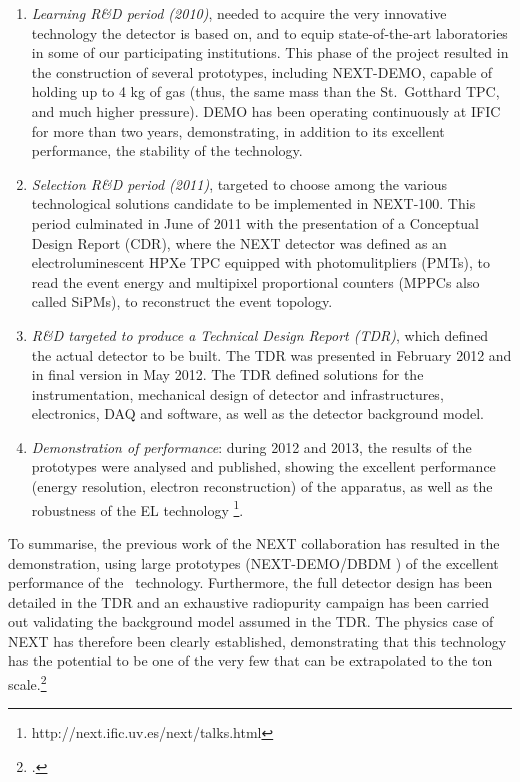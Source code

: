 \begin{enumerate}
\item {\em Learning R\&D period (2010)}, needed to acquire the very innovative technology the detector is based on, and to equip state-of-the-art laboratories in some of our participating institutions. This phase of the project resulted in the construction of several prototypes, including NEXT-DEMO, capable of holding up to 4 kg of gas (thus, the same mass than  the St.~Gotthard TPC, and much higher pressure). DEMO has been operating continuously at IFIC for more than two years, demonstrating, in addition to its excellent performance, the stability of the technology.  

\item {\em Selection R\&D period (2011)}, targeted to choose among the various technological solutions candidate to be implemented in NEXT-100. This period culminated in June of 2011 with the presentation of a Conceptual Design Report (CDR), where the NEXT detector was defined as an electroluminescent HPXe TPC equipped with photomulitpliers (PMTs),  to read the event energy and multipixel proportional counters (MPPCs also called SiPMs), to reconstruct the event topology. 

\item {\em R\&D targeted to produce a Technical Design Report (TDR)}, which defined the actual detector to be built. The TDR was presented in February 2012 and in final version in May 2012. The TDR defined solutions for the instrumentation, mechanical design of detector and infrastructures, electronics, DAQ and software, as well as the detector background model. 

\item {\em Demonstration of performance}: during 2012 and 2013, the results of the prototypes were analysed and published, showing the excellent performance (energy resolution, electron reconstruction) of the apparatus, as well as the robustness of the EL technology \footnote{http://next.ific.uv.es/next/talks.html}.  
\end{enumerate}

To summarise, the previous work of the NEXT collaboration has resulted in the demonstration, using large prototypes (NEXT-DEMO/DBDM ) of the excellent performance of the \HPXE\ technology. Furthermore, the full detector design has been detailed in the TDR and an exhaustive radiopurity campaign has been carried out  validating the background model assumed in the TDR.  The physics case of NEXT has therefore been clearly established, demonstrating that this technology has the potential to be one of the very few that can be extrapolated to the ton scale.\footcite{GomezCadenas:2012jv} 

